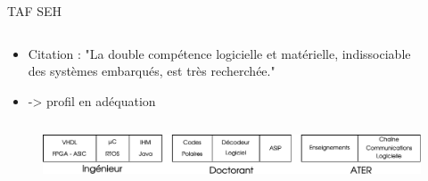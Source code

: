 \documentclass[t,compress,mathserif,12pt,xcolor=dvipsnames]{beamer}
\begin{document}
\begin{frame}[t]{TAF SEH}
  \begin{minipage}[t][5.0cm][t]{\textwidth}
    \begin{columns}
      \begin{column}{0.63\textwidth}
        \vspace{-30pt}
          \begin{itemize}
              \item Citation : "La double compétence logicielle et matérielle, indissociable des systèmes embarqués, est très recherchée."
              \item -> profil en adéquation
          \end{itemize}
      \end{column}
      \begin{column}{0.04\textwidth}

      \end{column}
      \begin{column}{0.33\textwidth}
      \end{column}
    \end{columns}
  \end{minipage}
  \begin{figure}[htp]
    \centering
    \includegraphics[width=\textwidth]{fig/frise}
  \end{figure}
\end{frame}
\end{document}
